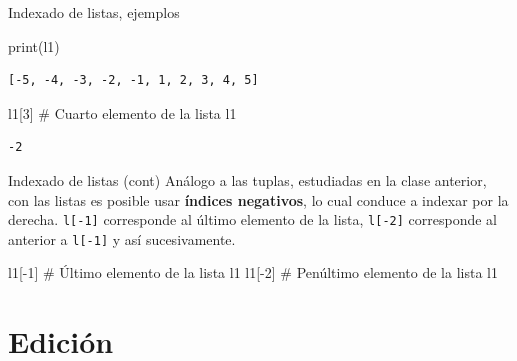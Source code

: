 \documentclass[
  ignorenonframetext,
  aspectratio=169,
  spanish,
]{beamer}
\newenvironment{Shaded}{\begin{snugshade}}{\end{snugshade}}
\newcommand{\BuiltInTok}[1]{\textcolor[rgb]{0.00,0.23,0.31}{#1}}
\newcommand{\CommentTok}[1]{\textcolor[rgb]{0.37,0.37,0.37}{#1}}
\newcommand{\DecValTok}[1]{\textcolor[rgb]{0.68,0.00,0.00}{#1}}
\newcommand{\NormalTok}[1]{\textcolor[rgb]{0.00,0.23,0.31}{#1}}
\newcommand{\OperatorTok}[1]{\textcolor[rgb]{0.37,0.37,0.37}{#1}}
\begin{document}
\begin{frame}[fragile]{Indexado de listas, ejemplos}
\label{indexado-de-listas-ejemplos}
\begin{Shaded}
\begin{Highlighting}[]
\BuiltInTok{print}\NormalTok{(l1)}
\end{Highlighting}
\end{Shaded}

\begin{verbatim}
[-5, -4, -3, -2, -1, 1, 2, 3, 4, 5]
\end{verbatim}

\begin{Shaded}
\begin{Highlighting}[]
\NormalTok{l1[}\DecValTok{3}\NormalTok{] }\CommentTok{\# Cuarto elemento de la lista l1}
\end{Highlighting}
\end{Shaded}

\begin{verbatim}
-2
\end{verbatim}
\end{frame}

\begin{frame}[fragile]{Indexado de listas (cont)}
\label{indexado-de-listas-cont}
Análogo a las tuplas, estudiadas en la clase anterior, con las listas es
posible usar \textbf{índices negativos}, lo cual conduce a indexar por
la derecha. \texttt{l{[}-1{]}} corresponde al último elemento de la
lista, \texttt{l{[}-2{]}} corresponde al anterior a \texttt{l{[}-1{]}} y
así sucesivamente.

\begin{Shaded}
\begin{Highlighting}[]
\NormalTok{l1[}\OperatorTok{{-}}\DecValTok{1}\NormalTok{] }\CommentTok{\# Último elemento de la lista l1}
\NormalTok{l1[}\OperatorTok{{-}}\DecValTok{2}\NormalTok{] }\CommentTok{\# Penúltimo elemento de la lista l1}
\end{Highlighting}
\end{Shaded}
\end{frame}

\section{Edición}\label{ediciuxf3n}
\end{document}
